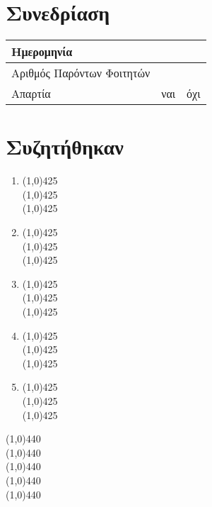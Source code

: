 \setcounter{section}{0}
\section{Συνεδρίαση}
\begin{Large}
\begin{tabular}{|l|>{\centering\arraybackslash}p{1.5cm}|>{\centering\arraybackslash}p{1.3cm}|}
\hline
Ημερομηνία & \multicolumn{2}{l|}{ \hspace{0.7cm}-\hspace{0.7cm}-\hspace{1.4cm}} \\ \hline
Αριθμός Παρόντων Φοιτητών & \multicolumn{2}{c|}{}\\ \hline
Απαρτία & ναι & όχι \\ \hline
\end{tabular}
\end{Large}
\vspace{1cm}
\section{Συζητήθηκαν}
\begin{Large}
\begin{enumerate}
 \item \line(1,0){425} \\
 \line(1,0){425} \\
 \line(1,0){425} \\
 \item \line(1,0){425} \\
 \line(1,0){425} \\
 \line(1,0){425} \\
  \item \line(1,0){425} \\
 \line(1,0){425} \\
 \line(1,0){425} \\
  \item \line(1,0){425} \\
 \line(1,0){425} \\
 \line(1,0){425} \\
  \item \line(1,0){425} \\
 \line(1,0){425} \\
 \line(1,0){425} \\

\end{enumerate}
\begin{center}
\line(1,0){440} \\
\line(1,0){440} \\
\line(1,0){440} \\
\line(1,0){440} \\
\line(1,0){440} \\
\end{center}
\end{Large}
\newpage
